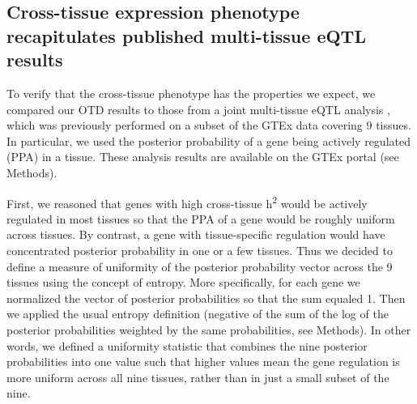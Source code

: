 \documentclass[10pt,letterpaper]{article}
\begin{document}

\subsection*{Cross-tissue expression phenotype recapitulates published multi-tissue eQTL results}

To verify that the cross-tissue phenotype has the properties we expect, we compared our OTD results to those from a joint multi-tissue eQTL analysis  \cite{Flutre_2013}, which was previously performed on a subset of the GTEx data \cite{Ardlie_2015} covering 9 tissues. In particular, we used the posterior probability of a gene being actively regulated (PPA) in a tissue. These analysis results are available on the GTEx portal (see Methods).

First, we reasoned that genes with high cross-tissue h\textsuperscript{2} would be actively regulated in most tissues so that the PPA of a gene would be roughly uniform across tissues. By contrast, a gene with tissue-specific regulation would have concentrated posterior probability in one or a few tissues. Thus we decided to define a measure of uniformity of the posterior probability vector across the 9 tissues using the concept of entropy. More specifically, for each gene we normalized the vector of posterior probabilities so that the sum equaled 1. Then we applied the usual entropy definition (negative of the sum of the log of the posterior probabilities weighted by the same probabilities, see Methods). In other words, we defined a uniformity statistic that combines the nine posterior probabilities into one value such that higher values mean the gene regulation is more uniform across all nine tissues, rather than in just a small subset of the nine.
\end{document}
